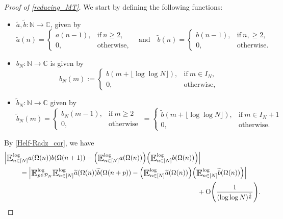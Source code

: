 \documentclass[letter,11pt]{article}
\theoremstyle{plain} %
\theoremstyle{definition} %
\theoremstyle{plain}
\theoremstyle{plain}
\theoremstyle{plain}
\numberwithin{equation}{section}
\newcommand{\Oh}{{\mathrm O}}
\newcommand{\N}{\mathbb{N}}
\newcommand{\C}{\mathbb{C}}
\renewcommand{\geq}{\geqslant}
\newcommand{\E}{\raisebox{-0.4ex}{\scalebox{1.4}[1.3]{$\mathbb{E}$}}}
\newcommand{\logE}{{\E}^{\log}}
\newcommand{\1}{\mathbbm{1}}
\newcommand{\Pc}{\mathcal{P}}
\begin{document}
\begin{proof}[Proof of \cref{reducing_MT}]
We start by defining the following functions:
\begin{itemize}
    \item $\widetilde{a},\widetilde{b}\colon\N\to\C$, given by 
    $$\widetilde{a}(n) 
    = 
    \begin{cases}
        a(n-1), & \text{if}~n\geq 2, \\
        0, & \text{otherwise},
    \end{cases}
    \quad\text{and}\quad
    \widetilde{b}(n) 
    = 
    \begin{cases}
        b(n-1), & \text{if}~n,\geq 2, \\
        0, & \text{otherwise}.
    \end{cases}
    $$
    \item $b_N\colon\N\to\C$ is given by
    $$b_N(m) 
    := 
    \begin{cases}
        b(m+\lfloor\log\log{N}\rfloor), & \text{if}~m\in I_N, \\
        0, & \text{otherwise},
    \end{cases}
    $$
    \item $\widetilde{b}_N\colon\N\to\C$ given by
    $$
    \widetilde{b}_N(m) = 
    \begin{cases}
        b_N(m-1), & \text{if}~m\geq 2 \\
        0, & \text{otherwise}
    \end{cases}
    \,=
    \begin{cases}
        \widetilde{b}(m+\lfloor\log\log{N}\rfloor), & \text{if}~m\in I_N+1 \\
        0, & \text{otherwise.}
    \end{cases}
    $$
\end{itemize}
By \cref{Helf-Radz_cor}, we have
\begin{align}\label{applying_Tao}
    & \Big|\logE_{n\in[N]} a(\Omega(n))b(\Omega(n+1)) - \Big(\logE_{n\in[N]}a(\Omega(n))\Big)\Big(\logE_{n\in[N]}b(\Omega(n))\Big)\Big| \notag \\
    & \hspace*{.8cm} = \Big|\logE_{p\in\Pc_N}\logE_{n\in[N]}\widetilde{a}(\Omega(n))\widetilde{b}(\Omega(n+p)) - \Big(\logE_{n\in[N]} \widetilde{a}(\Omega(n))\Big)\Big(\logE_{n\in[N]}\widetilde{b}(\Omega(n))\Big)\Big| \notag \\
    & \hspace*{10cm} + \Oh\Bigg(\frac{1}{(\log\log{N})^\frac{1}{6}}\Bigg).
\end{align}

\end{proof}
\end{document}
